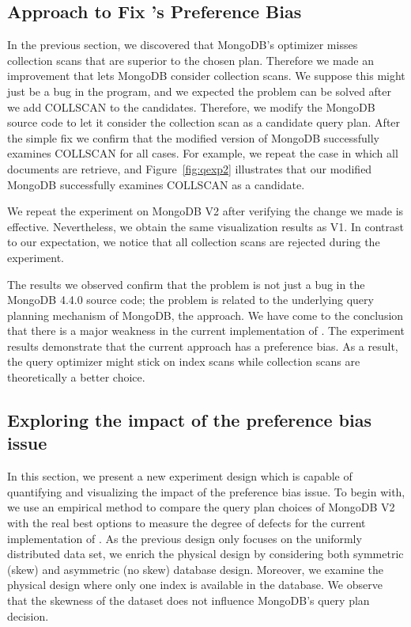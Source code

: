 \subsection{Approach to Fix \approachName's Preference Bias}
In the previous section, we discovered that MongoDB's \approachName optimizer misses collection scans that are superior to the chosen plan. 
 Therefore we made an improvement that lets MongoDB consider collection scans.
We suppose this might just be a bug in the program, and we 
expected the problem can be solved after we add COLLSCAN to 
the candidates. Therefore, we modify the MongoDB source code
to let it consider the collection scan as a candidate query plan. 
After the simple fix we confirm that the modified version of MongoDB successfully
examines COLLSCAN for all cases. For example, we repeat the case
in which all documents are retrieve, and Figure~\ref{fig:qexp2}
illustrates that our modified MongoDB successfully examines COLLSCAN 
as a candidate. 

We repeat the experiment on MongoDB V2 after verifying the 
change we made is effective. Nevertheless, we obtain the 
same visualization results as V1. In contrast to our expectation, 
we notice that all collection scans are rejected during the 
experiment. 

The results we observed confirm that the problem is not just 
a bug in the MongoDB 4.4.0 source code; the problem is 
related to the underlying query planning mechanism of MongoDB, 
the \approachName approach. We have come to the conclusion that there 
is a major weakness in the current implementation of \approachName. The
experiment results demonstrate that the current \approachName approach
has a preference bias. As a result, the query optimizer might 
stick on index scans while collection scans are theoretically 
a better choice.


\subsection{Exploring the impact of the preference bias issue}
In this section, we present a new experiment design which
is capable of quantifying and visualizing the impact of the 
preference bias issue. To begin with, we use an empirical 
method to compare the query plan choices of MongoDB V2 with
the real best options to measure the degree of defects for
the current implementation of \approachName. As the previous design 
only focuses on the uniformly distributed data set, we 
enrich the physical design by considering both symmetric 
(skew) and asymmetric (no skew) database design. Moreover, 
we examine the physical design where only one index is
available in the database. We observe that the skewness of
the dataset does not influence MongoDB's query plan decision.

